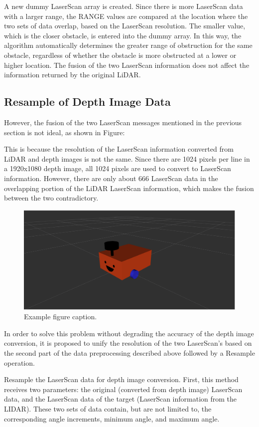 A new dummy LaserScan array is created. Since there is more LaserScan data with a larger range, the RANGE values are compared at the location where the two sets of data overlap, based on the LaserScan resolution. The smaller value, which is the closer obstacle, is entered into the dummy array. In this way, the algorithm automatically determines the greater range of obstruction for the same obstacle, regardless of whether the obstacle is more obstructed at a lower or higher location. The fusion of the two LaserScan information does not affect the information returned by the original LiDAR.

\subsection{Resample of Depth Image Data}
However, the fusion of the two LaserScan messages mentioned in the previous section is not ideal, as shown in Figure:

This is because the resolution of the LaserScan information converted from LiDAR and depth images is not the same. Since there are 1024 pixels per line in a 1920x1080 depth image, all 1024 pixels are used to convert to LaserScan information. However, there are only about 666 LaserScan data in the overlapping portion of the LiDAR LaserScan information, which makes the fusion between the two contradictory.
\begin{figure}[H]
    \centering
    \includegraphics[width=0.8\linewidth]{figs/robot.png}
    \caption{Example figure caption.}
\end{figure}
In order to solve this problem without degrading the accuracy of the depth image conversion, it is proposed to unify the resolution of the two LaserScan's based on the second part of the data preprocessing described above followed by a Resample operation.

Resample the LaserScan data for depth image conversion. First, this method receives two parameters: the original (converted from depth image) LaserScan data, and the LaserScan data of the target (LaserScan information from the LIDAR). These two sets of data contain, but are not limited to, the corresponding angle increments, minimum angle, and maximum angle.

